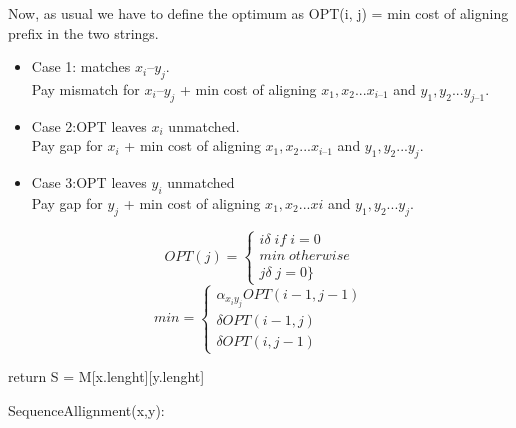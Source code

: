 \documentclass[11pt]{article}
\begin{document}
Now, as usual we have to define the optimum as OPT(i, j) = min cost of aligning prefix in the two strings.

\begin{itemize}

\item {Case 1: matches $x_{i} – y_{j}$.}\\
Pay mismatch for $x_{i} – y_{j}$ + min cost of aligning $x_{1}, x_{2} ... x_{i–1}$ and $y_{1} ,y_{2} ... y_{j–1}$.

\item {Case 2:OPT leaves $x_{i}$ unmatched.}\\
Pay gap for $x_{i}$ + min cost of aligning $x_{1}, x_{2} ... x_{i–1}$ and $y_{1}, y_{2} ... y_{j}$.

\item {Case 3:OPT leaves $y_{i}$ unmatched}\\
Pay gap for $y_{j}$ + min cost of aligning $x{_1},x_{2} ... x{i}$ and $y_{1}, y_{2} ... y_{j}$.

\end{itemize}

\[OPT(j) = \begin{cases} i\delta \; if \; i = 0 \\ min \;otherwise \\ j\delta \; j=0 \}  \end{cases}\]
\[min=\begin{cases} \alpha _{x_{i} y_{j}} OPT(i−1, j-1) \\ \delta OPT(i−1, j) \\ \delta  O P T ( i , j − 1 )  \end{cases}\]


\begin{algorithm}[H]
\SetAlgoLined
\small
{}

\BlankLine


\BlankLine


\BlankLine


\BlankLine
return S = M[x.lenght][y.lenght]


\caption{SequenceAllignment(x,y):}
\end{algorithm}
\end{document}
